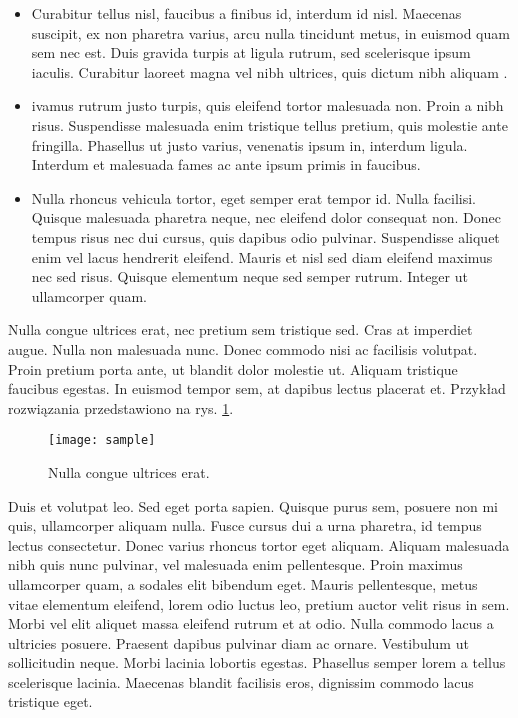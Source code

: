 \begin{itemize}

	\item Curabitur tellus nisl, faucibus a finibus id, interdum id nisl. Maecenas suscipit, ex non pharetra varius, arcu nulla tincidunt metus, in euismod quam sem nec est. Duis gravida turpis at ligula rutrum, sed scelerisque ipsum iaculis. Curabitur laoreet magna vel nibh ultrices, quis dictum nibh aliquam \cite{Biala2012}.
	
	\item ivamus rutrum justo turpis, quis eleifend tortor malesuada non. Proin a nibh risus. Suspendisse malesuada enim tristique tellus pretium, quis molestie ante fringilla. Phasellus ut justo varius, venenatis ipsum in, interdum ligula. Interdum et malesuada fames ac ante ipsum primis in faucibus.  
	
	\item Nulla rhoncus vehicula tortor, eget semper erat tempor id. Nulla facilisi. Quisque malesuada pharetra neque, nec eleifend dolor consequat non. Donec tempus risus nec dui cursus, quis dapibus odio pulvinar. Suspendisse aliquet enim vel lacus hendrerit eleifend. Mauris et nisl sed diam eleifend maximus nec sed risus. Quisque elementum neque sed semper rutrum. Integer ut ullamcorper quam. 

\end{itemize}

Nulla congue ultrices erat, nec pretium sem tristique sed. Cras at imperdiet augue. Nulla non malesuada nunc. Donec commodo nisi ac facilisis volutpat. Proin pretium porta ante, ut blandit dolor molestie ut. Aliquam tristique faucibus egestas. In euismod tempor sem, at dapibus lectus placerat et. Przykład rozwiązania przedstawiono na rys. \ref{fig:sample}.

\begin{figure}[!ht]
	\texttt{[image: sample]}
	\centering
	\caption{Nulla congue ultrices erat.}
	\label{fig:sample}
\end{figure}

Duis et volutpat leo. Sed eget porta sapien. Quisque purus sem, posuere non mi quis, ullamcorper aliquam nulla. Fusce cursus dui a urna pharetra, id tempus lectus consectetur. Donec varius rhoncus tortor eget aliquam. Aliquam malesuada nibh quis nunc pulvinar, vel malesuada enim pellentesque. Proin maximus ullamcorper quam, a sodales elit bibendum eget. Mauris pellentesque, metus vitae elementum eleifend, lorem odio luctus leo, pretium auctor velit risus in sem. Morbi vel elit aliquet massa eleifend rutrum et at odio. Nulla commodo lacus a ultricies posuere. Praesent dapibus pulvinar diam ac ornare. Vestibulum ut sollicitudin neque. Morbi lacinia lobortis egestas. Phasellus semper lorem a tellus scelerisque lacinia. Maecenas blandit facilisis eros, dignissim commodo lacus tristique eget.

